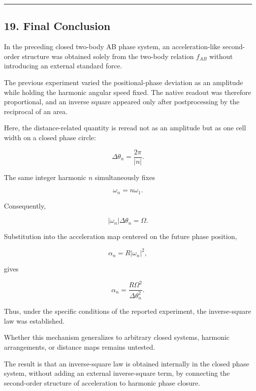 \documentclass[
  a4paper,
]{article}
\begin{document}
\begin{center}\rule{0.5\linewidth}{0.5pt}\end{center}

\subsection{19. Final Conclusion}\label{final-conclusion}

In the preceding closed two-body AB phase system, an acceleration-like
second-order structure was obtained solely from the two-body relation
\(f_{AB}\) without introducing an external standard force.

The previous experiment varied the positional-phase deviation as an
amplitude while holding the harmonic angular speed fixed. The native
readout was therefore proportional, and an inverse square appeared only
after postprocessing by the reciprocal of an area.

Here, the distance-related quantity is reread not as an amplitude but as
one cell width on a closed phase circle:

\[
\Delta\theta_n=\frac{2\pi}{|n|}.
\]

The same integer harmonic \(n\) simultaneously fixes

\[
\omega_n=n\omega_1.
\]

Consequently,

\[
|\omega_n|\Delta\theta_n=\Omega.
\]

Substitution into the acceleration map centered on the future phase
position,

\[
\alpha_n=R|\omega_n|^2,
\]

gives

\[
\boxed{
\alpha_n
=\frac{R\Omega^2}{\Delta\theta_n^2}
}.
\]

Thus, under the specific conditions of the reported experiment, the
inverse-square law was established.

Whether this mechanism generalizes to arbitrary closed systems, harmonic
arrangements, or distance maps remains untested.

The result is that an inverse-square law is obtained internally in the
closed phase system, without adding an external inverse-square term, by
connecting the second-order structure of acceleration to harmonic phase
closure.
\end{document}
